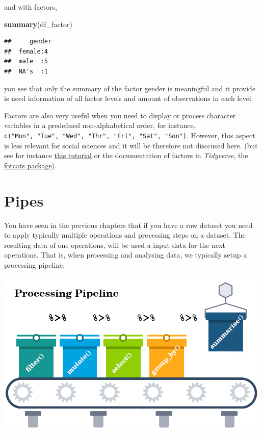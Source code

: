 \documentclass[
]{scrartcl}
\makeatletter
\newenvironment{Shaded}{\begin{snugshade}}{\end{snugshade}}
\newcommand{\FunctionTok}[1]{\textcolor[rgb]{0.13,0.29,0.53}{\textbf{#1}}}
\newcommand{\NormalTok}[1]{#1}
\newenvironment{kframe}{%
\medskip{}
\setlength{\fboxsep}{.8em}
 \def\at@end@of@kframe{}%
 \ifinner\ifhmode%
  \def\at@end@of@kframe{\end{minipage}}%
  \begin{minipage}{\columnwidth}%
 \fi\fi%
 \def\FrameCommand##1{\hskip\@totalleftmargin \hskip-\fboxsep
 \colorbox{shadecolor}{##1}\hskip-\fboxsep
     \hskip-\linewidth \hskip-\@totalleftmargin \hskip\columnwidth}%
 \MakeFramed {\advance\hsize-\width
   \@totalleftmargin\z@ \linewidth\hsize
   \@setminipage}}%
 {\par\unskip\endMakeFramed%
 \at@end@of@kframe}
\newenvironment{rmdblock}[1]
  {
  \begin{itemize}
  \renewcommand{\labelitemi}{
    \raisebox{-.7\height}[0pt][0pt]{
      {\setkeys{Gin}{width=3em,keepaspectratio}\texttt{[image: images/\#1]}}
    }
  }
  \setlength{\fboxsep}{1em}
  \begin{kframe}
  \item
  }
  {
  \end{kframe}
  \end{itemize}
  }
\newenvironment{geek}
    {\begin{rmdblock}{geek}}
    {\end{rmdblock}}
\makeatother
\begin{document}
and with factors,

\begin{Shaded}
\begin{Highlighting}[]
\FunctionTok{summary}\NormalTok{(df\_factor)}
\end{Highlighting}
\end{Shaded}

\begin{verbatim}
##     gender 
##  female:4  
##  male  :5  
##  NA's  :1
\end{verbatim}

you see that only the summary of the factor gender is meaningful and it provide is need information of all factor levels and amount of observations in each level.

\begin{geek}
Factors are also very useful when you need to display or process
character variables in a predefined non-alphabetical order, for
instance,
\texttt{c("Mon",\ "Tue",\ "Wed",\ "Thr",\ "Fri",\ "Sat",\ "Son")}.
However, this aspect is less relevant for social sciences and it will be
therefore not disccused here. (but see for instance
\href{https://r4ds.had.co.nz/factors.html\#introduction-9}{this
tutorial} or the documentation of factors in \emph{Tidyverse}, the
\href{https://forcats.tidyverse.org/}{forcats package}).
\end{geek}

\hypertarget{pipes}{%
\section{Pipes}\label{pipes}}

You have seen in the previous chapters that if you have a raw dataset you need to apply typically multiple operations and processing steps on a dataset. The resulting data of one operations, will be used a input data for the next operations. That is, when processing and analysing data, we typically setup a processing pipeline.

\begin{center}\includegraphics[width=500px]{images/pipeline} \end{center}
\end{document}
